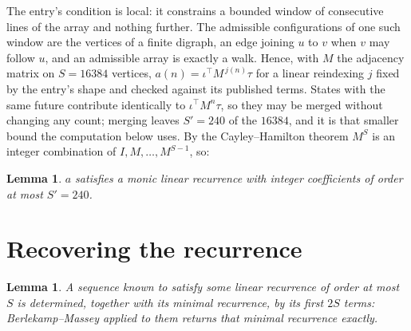 \documentclass[11pt,a4paper]{article}
\theoremstyle{plain}
\newtheorem{lemma}[theorem]{Lemma}
\theoremstyle{definition}
\begin{document}
The entry's condition is local: it constrains a bounded window of consecutive lines of the
array and nothing further. The admissible configurations of one such window are the vertices
of a finite digraph, an edge joining $u$ to $v$ when $v$ may follow $u$, and an admissible
array is exactly a walk. Hence, with $M$ the adjacency matrix on $S=16384$ vertices,
$a(n)=\iota^{\!\top}M^{\,j(n)}\tau$ for a linear reindexing $j$ fixed by the entry's shape
and checked against its published terms. States with the same future contribute identically to $\iota^{\!\top}M^n\tau$, so they may be merged without changing any count; merging leaves $S'=240$ of the $16384$, and it is that smaller bound the computation below uses. By the Cayley--Hamilton theorem $M^{S}$ is an
integer combination of $I,M,\dots,M^{S-1}$, so:

\begin{lemma}\label{lem:cf}
$a$ satisfies a monic linear recurrence with integer coefficients of order at most
$S'=240$.
\end{lemma}

\section{Recovering the recurrence}

\begin{lemma}\label{lem:bm}
A sequence known to satisfy some linear recurrence of order at most $S$ is determined, together
with its minimal recurrence, by its first $2S$ terms: Berlekamp--Massey applied to them returns
that minimal recurrence exactly.
\end{lemma}
\end{document}
